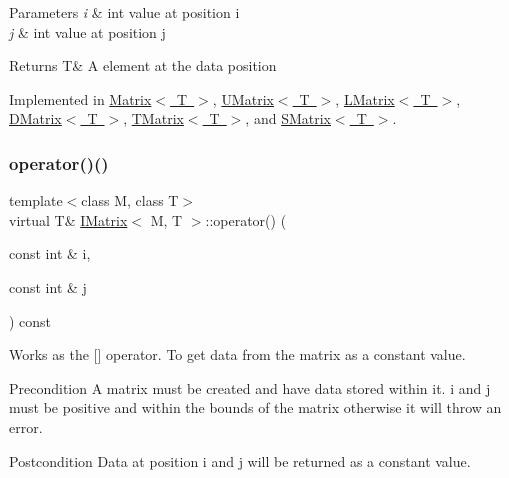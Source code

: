 \begin{DoxyParams}{Parameters}
{\em i} & int value at position i \\
\hline
{\em j} & int value at position j \\
\hline
\end{DoxyParams}
\begin{DoxyReturn}{Returns}
T\& A element at the data position 
\end{DoxyReturn}


Implemented in \mbox{\hyperlink{class_matrix_a685ee55a86c08533f9593247a6220a18}{Matrix$<$ T $>$}}, \mbox{\hyperlink{class_u_matrix_a06c554ab9d6deb7d1950cdd49eb089e0}{U\+Matrix$<$ T $>$}}, \mbox{\hyperlink{class_l_matrix_aa0b1bc37d56538dbdd4fcb3b88dcc3ec}{L\+Matrix$<$ T $>$}}, \mbox{\hyperlink{class_d_matrix_a4dc37695c56a6c4917159877d2aa3d81}{D\+Matrix$<$ T $>$}}, \mbox{\hyperlink{class_t_matrix_a4fa62998b2fe8babbc78f80c230fca45}{T\+Matrix$<$ T $>$}}, and \mbox{\hyperlink{class_s_matrix_a23038e6371f572bc37c4aec7fe415536}{S\+Matrix$<$ T $>$}}.

\mbox{\label{class_i_matrix_a2abf1a0d2454051da3ccf9cacf12797e}} 
\subsubsection{\texorpdfstring{operator()()}{operator()()}\hspace{0.1cm}{\footnotesize\ttfamily [2/2]}}
{\footnotesize\ttfamily template$<$class M, class T$>$ \\
virtual T\& \mbox{\hyperlink{class_i_matrix}{I\+Matrix}}$<$ M, T $>$\+::operator() (\begin{DoxyParamCaption}\item[{const int \&}]{i,  }\item[{const int \&}]{j }\end{DoxyParamCaption}) const\hspace{0.3cm}{\ttfamily [pure virtual]}}



Works as the \mbox{[}\mbox{]} operator. To get data from the matrix as a constant value. 

\begin{DoxyPrecond}{Precondition}
A matrix must be created and have data stored within it. i and j must be positive and within the bounds of the matrix otherwise it will throw an error. 
\end{DoxyPrecond}
\begin{DoxyPostcond}{Postcondition}
Data at position i and j will be returned as a constant value.
\end{DoxyPostcond}


